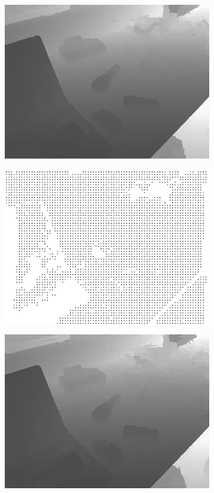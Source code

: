 \documentclass[preprint,10pt,5p,times,twocolumn]{elsarticle}
\begin{document}
\begin{figure}[t]
\begin{center}
\begin{subfigure}[b]{0.136\linewidth}
    \includegraphics[width=\linewidth]{desk_random_missing_inpainting.png}
\end{subfigure}
\begin{subfigure}[b]{0.136\linewidth}
    \includegraphics[width=\linewidth]{desk_upsampling_depth.png}
\end{subfigure}
\begin{subfigure}[b]{0.136\linewidth}
    \includegraphics[width=\linewidth]{desk_upsampling_inpainting.png}

\end{subfigure}
\end{center}
\end{figure}
\end{document}
